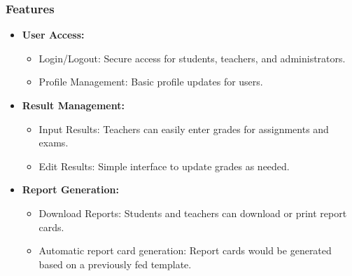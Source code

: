 \documentclass{beamer}
\begin{document}
\begin{frame}
    \frametitle{Features}
    \begin{itemize}
        \item \textbf{User Access:}
          \begin{itemize} 
            \item Login/Logout: Secure access for students, teachers, and administrators.
            \item Profile Management: Basic profile updates for users.
          \end{itemize}
        \item \textbf{ Result Management:}
          \begin{itemize} 
            \item Input Results: Teachers can easily enter grades for assignments and exams.
            \item Edit Results: Simple interface to update grades as needed.
          \end{itemize}   
         
        \item \textbf{ Report Generation:}
          \begin{itemize} 
            \item  Download Reports: Students and teachers can download or print report cards.
            \item Automatic report card generation: Report cards would be generated based on a previously fed template.
          \end{itemize}  
        \end{itemize}
    \end{frame} 
\end{document}
